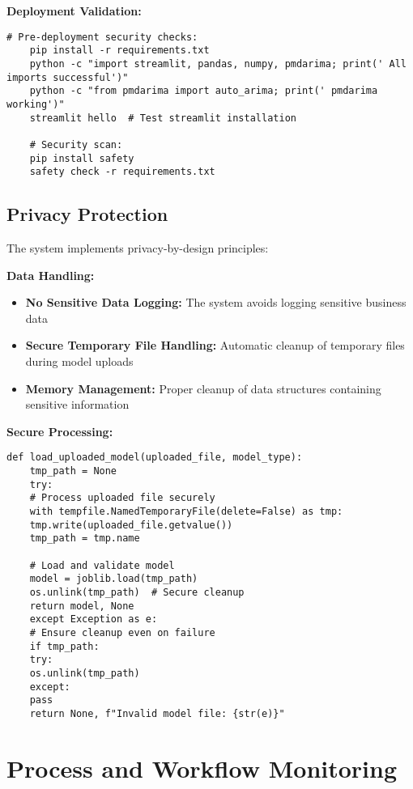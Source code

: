 \textbf{Deployment Validation:}
\begin{lstlisting}[language=MyPython, caption={Pre-Deployment Security Validation}]
	# Pre-deployment security checks:
	pip install -r requirements.txt
	python -c "import streamlit, pandas, numpy, pmdarima; print(' All imports successful')"
	python -c "from pmdarima import auto_arima; print(' pmdarima working')"
	streamlit hello  # Test streamlit installation
	
	# Security scan:
	pip install safety
	safety check -r requirements.txt
\end{lstlisting}

\subsection{Privacy Protection}

The system implements privacy-by-design principles:

\textbf{Data Handling:}
\begin{itemize}
	\item \textbf{No Sensitive Data Logging:} The system avoids logging sensitive business data
	\item \textbf{Secure Temporary File Handling:} Automatic cleanup of temporary files during model uploads
	\item \textbf{Memory Management:} Proper cleanup of data structures containing sensitive information
\end{itemize}

\textbf{Secure Processing:}
\begin{lstlisting}[language=MyPython, caption={Secure File Processing with Cleanup}]
	def load_uploaded_model(uploaded_file, model_type):
	tmp_path = None
	try:
	# Process uploaded file securely
	with tempfile.NamedTemporaryFile(delete=False) as tmp:
	tmp.write(uploaded_file.getvalue())
	tmp_path = tmp.name
	
	# Load and validate model
	model = joblib.load(tmp_path)
	os.unlink(tmp_path)  # Secure cleanup
	return model, None
	except Exception as e:
	# Ensure cleanup even on failure
	if tmp_path:
	try:
	os.unlink(tmp_path)
	except:
	pass
	return None, f"Invalid model file: {str(e)}"
\end{lstlisting}

\section{Process and Workflow Monitoring}

